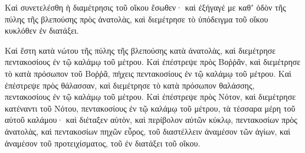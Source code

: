 {\par }{\PP {}Καὶ συνετελέσθη ἡ διαμέτρησις τοῦ οἴκου ἔσωθεν· καὶ ἐξήγαγέ με καθʼ ὁδὸν τῆς πύλης τῆς βλεπούσης πρὸς ἀνατολὰς, καὶ διεμέτρησε τὸ ὑπόδειγμα τοῦ οἴκου κυκλόθεν ἐν διατάξει.
\par }{\PP {}Καὶ ἔστη κατὰ νώτου τῆς πύλης τῆς βλεπούσης κατὰ ἀνατολὰς, καὶ διεμέτρησε πεντακοσίους ἐν τῷ καλάμῳ τοῦ μέτρου.
Καὶ ἐπέστρεψε πρὸς Βοῤῥᾶν, καὶ διεμέτρησε τὸ κατὰ πρόσωπον τοῦ Βοῤῥᾶ, πήχεις πεντακοσίους ἐν τῷ καλάμῳ τοῦ μέτρου.
Καὶ ἐπέστρεψε πρὸς θάλασσαν, καὶ διεμέτρησε τὸ κατὰ πρόσωπον θαλάσσης, πεντακοσίους ἐν τῷ καλάμῳ τοῦ μέτρου.
Καὶ ἐπέστρεψε πρὸς Νότον, καὶ διεμέτρησε κατέναντι τοῦ Νότου, πεντακοσίους ἐν τῷ καλάμῳ τοῦ μέτρου,
τὰ τέσσαρα μέρη τοῦ αὐτοῦ καλάμου· καὶ διέταξεν αὐτὸν, καὶ περίβολον αὐτῶν κύκλῳ, πεντακοσίων πρὸς ἀνατολὰς, καὶ πεντακοσίων πηχῶν εὖρος, τοῦ διαστέλλειν ἀναμέσον τῶν ἁγίων, καὶ ἀναμέσον τοῦ προτειχίσματος, τοῦ ἐν διατάξει τοῦ οἴκου.

}
